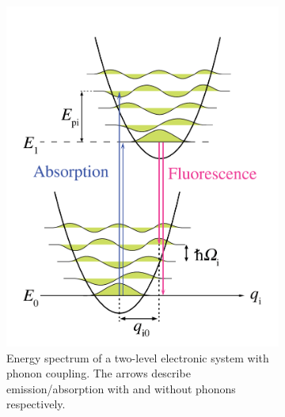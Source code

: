 \begin{figure}[H]
	\centering
	\begin{subfigure}[b]{0.48\textwidth}
		\centering
		\includegraphics[width=\textwidth]{figures/quantum-dot/Phonon-energy-diagram}
		\caption{Energy spectrum of a two-level electronic system with phonon coupling.
			The arrows describe emission/absorption with and without phonons respectively.}
		\label{fig:phonon-energy-diagram}
	\end{subfigure}%
	~ %
	\begin{subfigure}[b]{0.48\textwidth}
		\centering

\end{subfigure}
\end{figure}
